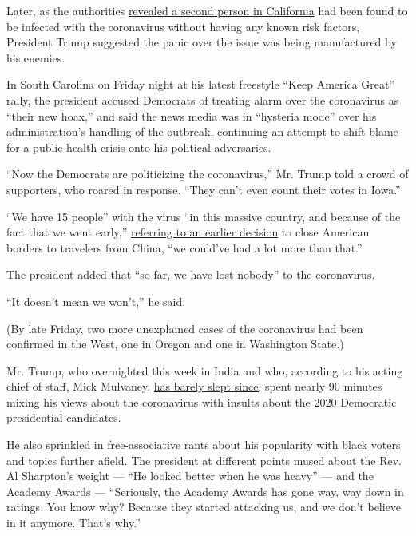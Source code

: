 Later, as the authorities
\href{https://www.nytimes3xbfgragh.onion/2020/02/28/world/coronavirus-update.html?action=click\&module=Spotlight\&pgtype=Homepage\#link-37d1b786}{revealed
a second person in California} had been found to be infected with the
coronavirus without having any known risk factors, President Trump
suggested the panic over the issue was being manufactured by his
enemies.

In South Carolina on Friday night at his latest freestyle ``Keep America
Great'' rally, the president accused Democrats of treating alarm over
the coronavirus as ``their new hoax,'' and said the news media was in
``hysteria mode'' over his administration's handling of the outbreak,
continuing an attempt to shift blame for a public health crisis onto his
political adversaries.

``Now the Democrats are politicizing the coronavirus,'' Mr. Trump told a
crowd of supporters, who roared in response. ``They can't even count
their votes in Iowa.''

``We have 15 people'' with the virus ``in this massive country, and
because of the fact that we went early,''
\href{https://www.nytimes3xbfgragh.onion/2020/02/02/us/politics/trump-super-bowl-interview-coronavirus.html}{referring
to an earlier decision} to close American borders to travelers from
China, ``we could've had a lot more than that.''

The president added that ``so far, we have lost nobody'' to the
coronavirus.

``It doesn't mean we won't,'' he said.

(By late Friday, two more unexplained cases of the coronavirus had been
confirmed in the West, one in Oregon and one in Washington State.)

Mr. Trump, who overnighted this week in India and who, according to his
acting chief of staff, Mick Mulvaney,
\href{https://twitter.com/atrupar/status/1233461717839073282?ref_src=twsrc\%5Etfw\%7Ctwcamp\%5Etweetembed\%7Ctwterm\%5E1233461717839073282\&ref_url=https\%3A\%2F\%2Fnymag.com\%2Fintelligencer\%2F2020\%2F02\%2Fmick-mulvaney-praises-donald-trump-as-tireless-workaholic-twitter.html}{has
barely slept since,} spent nearly 90 minutes mixing his views about the
coronavirus with insults about the 2020 Democratic presidential
candidates.

He also sprinkled in free-associative rants about his popularity with
black voters and topics further afield. The president at different
points mused about the Rev. Al Sharpton's weight --- ``He looked better
when he was heavy'' --- and the Academy Awards --- ``Seriously, the
Academy Awards has gone way, way down in ratings. You know why? Because
they started attacking us, and we don't believe in it anymore. That's
why.''

